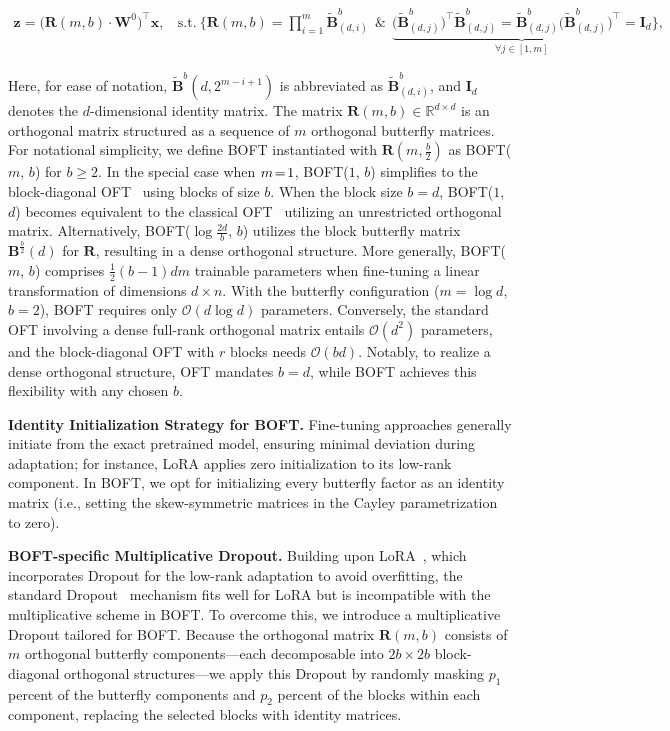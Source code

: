 \begin{equation}
    \begin{aligned}\nonumber
    \bm{z} = \big(\bm{R}(m,b) \cdot \bm{W}^0\big)^\top \bm{x},~~~~\text{s.t.}~\bigg\{\bm{R}(m,b) = \prod_{i=1}^m \tilde{\bm{B}}^b_{(d,i)}~~\&~~\underbrace{\big(\tilde{\bm{B}}^b_{(d,j)}\big)^\top\tilde{\bm{B}}^b_{(d,j)} = \tilde{\bm{B}}^b_{(d,j)}\big(\tilde{\bm{B}}^b_{(d,j)}\big)^\top\! = \bm{I}_d}_{\forall j\in [1, m]}\bigg\},
    \end{aligned}
\end{equation}

Here, for ease of notation, $\tilde{\bm{B}}^b(d,2^{m-i+1})$ is abbreviated as $\tilde{\bm{B}}^b_{(d,i)}$, and $\bm{I}_d$ denotes the $d$-dimensional identity matrix. The matrix $\bm{R}(m,b) \in \mathbb{R}^{d\times d}$ is an orthogonal matrix structured as a sequence of $m$ orthogonal butterfly matrices. For notational simplicity, we define BOFT instantiated with $\bm{R}(m,\frac{b}{2})$ as BOFT($m$, $b$) for $b\geq 2$. In the special case when $\thickmuskip=2mu \medmuskip=2mu m=1$, BOFT($1$, $b$) simplifies to the block-diagonal OFT~\cite{qiu2023controlling} using blocks of size $b$. When the block size $b=d$, BOFT($1$, $d$) becomes equivalent to the classical OFT~\cite{qiu2023controlling} utilizing an unrestricted orthogonal matrix. Alternatively, BOFT($\log \frac{2d}{b}$, $b$) utilizes the block butterfly matrix $\bm{B}^{\frac{b}{2}}(d)$ for $\bm{R}$, resulting in a dense orthogonal structure. More generally, BOFT($m$, $b$) comprises $\frac{1}{2}(b-1)dm$ trainable parameters when fine-tuning a linear transformation of dimensions $d \times n$. With the butterfly configuration ($m = \log d$, $b = 2$), BOFT requires only $\mathcal{O}(d\log d)$ parameters. Conversely, the standard OFT involving a dense full-rank orthogonal matrix entails $\mathcal{O}(d^2)$ parameters, and the block-diagonal OFT with $r$ blocks needs $\mathcal{O}(bd)$. Notably, to realize a dense orthogonal structure, OFT mandates $b=d$, while BOFT achieves this flexibility with any chosen $b$.

\textbf{Identity Initialization Strategy for BOFT.} Fine-tuning approaches generally initiate from the exact pretrained model, ensuring minimal deviation during adaptation; for instance, LoRA applies zero initialization to its low-rank component. In BOFT, we opt for initializing every butterfly factor as an identity matrix (i.e., setting the skew-symmetric matrices in the Cayley parametrization to zero).

\textbf{BOFT-specific Multiplicative Dropout.} Building upon LoRA~\cite{hulora2022}, which incorporates Dropout for the low-rank adaptation to avoid overfitting, the standard Dropout~\cite{srivastava2014dropout} mechanism fits well for LoRA but is incompatible with the multiplicative scheme in BOFT. To overcome this, we introduce a multiplicative Dropout tailored for BOFT. Because the orthogonal matrix $\bm{R}(m,b)$ consists of $m$ orthogonal butterfly components—each decomposable into $2b\times 2b$ block-diagonal orthogonal structures—we apply this Dropout by randomly masking $p_1$ percent of the butterfly components and $p_2$ percent of the blocks within each component, replacing the selected blocks with identity matrices.

